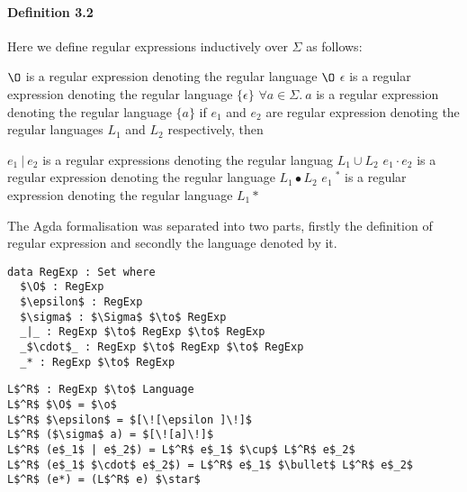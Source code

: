 \documentclass[twoside,openright,final]{bhamthesis}
\renewcommand{\item}{\itemindent0.5cm\itemold}
\begin{document}
\paragraph{Definition 3.2} Here we define regular expressions
inductively over
\(\Sigma\) as follows: 
\begin{enumerate}
  \item \(\O\) is a regular expression denoting the regular language \(\O\)
  \item \(\epsilon\) is a regular expression denoting the regular language \(\{\epsilon\}\)
  \item \(\forall a\in\Sigma.\ a\) is a regular expression denoting the regular language \(\{a\}\)
  \item if \(e_{1}\) and \(e_{2}\) are regular expression denoting the regular
    languages \(L_1\) and \(L_2\) respectively, then
    \begin{enumerate}
      \item \(e_{1}\ |\ e_{2}\) is a regular expressions denoting the
        regular languag \(L_1 \cup L_2\)
      \item \(e_{1}\cdot e_{2}\) is a regular expression denoting the
        regular language \(L_1\bullet L_2\)
      \item \(e_{1}\ ^{*}\) is a regular expression denoting the regular
        language \(L_1\ast\) 
     \end{enumerate}
\end{enumerate}

\par The Agda formalisation was separated into two parts, firstly the
definition of regular expression and secondly the language denoted by
it.

\begin{lstlisting}[caption=Regular Expression,mathescape=true]
data RegExp : Set where
  $\O$ : RegExp
  $\epsilon$ : RegExp
  $\sigma$ : $\Sigma$ $\to$ RegExp
  _|_ : RegExp $\to$ RegExp $\to$ RegExp
  _$\cdot$_ : RegExp $\to$ RegExp $\to$ RegExp
  _* : RegExp $\to$ RegExp
\end{lstlisting} 

\begin{lstlisting}[caption=Languages denoted by Regular Expressions,mathescape=true]
L$^R$ : RegExp $\to$ Language
L$^R$ $\O$ = $\o$
L$^R$ $\epsilon$ = $[\![\epsilon ]\!]$
L$^R$ ($\sigma$ a) = $[\![a]\!]$
L$^R$ (e$_1$ | e$_2$) = L$^R$ e$_1$ $\cup$ L$^R$ e$_2$
L$^R$ (e$_1$ $\cdot$ e$_2$) = L$^R$ e$_1$ $\bullet$ L$^R$ e$_2$
L$^R$ (e*) = (L$^R$ e) $\star$
\end{lstlisting}
\end{document}
